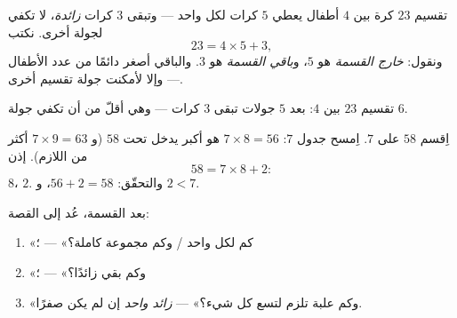 \begin{definition}[الباقي]\label{def:g3:division:remainder}
تقسيم $23$ كرة بين $4$ أطفال يعطي $5$ كرات لكل واحد ---
وتبقى $3$ كرات \emph{زائدة}، لا تكفي لجولة أخرى.
نكتب
\[
23 = 4 \times 5 + 3 ,
\]
ونقول: \emph{خارج القسمة} هو $5$،
و\emph{باقي القسمة} هو $3$. والباقي أصغر
دائمًا من عدد الأطفال --- وإلا لأمكنت جولة تقسيم
أخرى.
\end{definition}

\begin{omfigure}

{\small تقسيم $23$ بين $4$: بعد $5$ جولات تبقى $3$ كرات
--- وهي أقلّ من أن تكفي جولة $6$.}
\end{omfigure}

\begin{example}\label{ex:g3:division:remainder}
اِقسم $58$ على $7$. اِمسح جدول $7$:
 $7 \times 8 = 56$ هو أكبر  يدخل تحت $58$
(و $7 \times 9 = 63$ أكثر من اللازم). إذن
\[
58 = 7 \times 8 + 2 :
\]
 $8$،  $2$. والتحقّق: $56 + 2 = 58$، و $2 < 7$.
\end{example}

\begin{method}\label{met:g3:division:interpret}
بعد القسمة، عُد إلى القصة:
\begin{enumerate}
  \item «كم لكل واحد / وكم مجموعة كاملة؟» --- ؛
  \item «وكم بقي زائدًا؟» --- ؛
  \item «وكم علبة تلزم لتسع كل شيء؟» --- 
        \emph{زائد واحد} إن لم يكن  صفرًا.
\end{enumerate}
\end{method}

